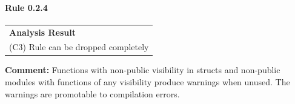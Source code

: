 \paragraph{Rule 0.2.4}
\begin{longtable}{p{13cm}}
\textbf{Analysis Result} \\
(C3) Rule can be dropped completely \\
\end{longtable}
\textbf{Comment:} Functions with non-public visibility in structs and non-public modules with functions of any visibility produce warnings when unused. The warnings are promotable to compilation errors. \\


